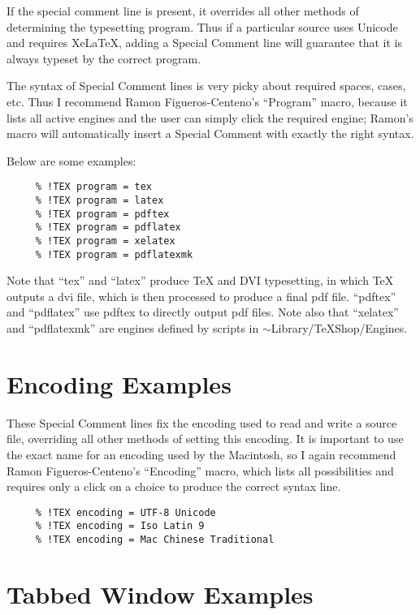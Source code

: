 \documentclass[11pt, oneside]{article}   	%
\begin{document}
If the special comment line is present, it overrides all other methods of determining the typesetting program. Thus if a particular source uses Unicode and requires XeLaTeX, adding a Special Comment line will guarantee that it is always typeset by the correct program.

The syntax of Special Comment lines is very picky about required spaces, cases, etc. Thus I recommend 
Ramon Figueros-Centeno's ``Program'' macro, because it lists all active engines and the user can simply click the required engine; Ramon's macro will automatically insert a Special Comment with exactly the right syntax.

Below are some examples:

\begin{verbatim}
     % !TEX program = tex               
     % !TEX program = latex
     % !TEX program = pdftex
     % !TEX program = pdflatex
     % !TEX program = xelatex
     % !TEX program = pdflatexmk
\end{verbatim}

Note that ``tex'' and ``latex'' produce TeX and DVI typesetting, in which TeX outputs a dvi file, which is then processed to produce a final pdf file. ``pdftex'' and ``pdflatex'' use pdftex to directly output pdf files.
Note also that ``xelatex'' and ``pdflatexmk'' are engines defined by scripts in $\sim$Library/TeXShop/Engines.

\section{Encoding Examples}

These Special Comment lines fix the encoding used to read and write a source file, overriding all other methods of setting this encoding. It is important to use the exact name for an encoding used by the Macintosh, so I again recommend Ramon Figueros-Centeno's ``Encoding'' macro, which lists all possibilities and requires only a click on a choice to produce the correct syntax line.
 
 \begin{verbatim}    
     % !TEX encoding = UTF-8 Unicode
     % !TEX encoding = Iso Latin 9
     % !TEX encoding = Mac Chinese Traditional
 \end{verbatim}    
   
 \section{Tabbed Window Examples}
  
\end{document}
